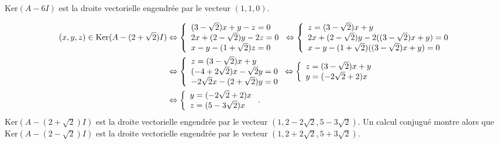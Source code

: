 {\begin{enumerate}
{$\text{Ker}(A-6I)$ est la droite vectorielle engendrée par le vecteur $(1,1,0)$.

\begin{align*}\ensuremath
(x,y,z)\in\text{Ker}(A-(2+\sqrt{2})I)&\Leftrightarrow\left\{
\begin{array}{l}
(3-\sqrt{2})x+y-z=0\\
2x+(2-\sqrt{2})y-2z=0\\
x-y-(1+\sqrt{2})z=0
\end{array}
\right.\Leftrightarrow\left\{
\begin{array}{l}
z=(3-\sqrt{2})x+y\\
2x+(2-\sqrt{2})y-2((3-\sqrt{2})x+y)=0\\
x-y-(1+\sqrt{2})((3-\sqrt{2})x+y)=0
\end{array}
\right.
\\
 &\Leftrightarrow\left\{
\begin{array}{l}
z=(3-\sqrt{2})x+y\\
(-4+2\sqrt{2})x-\sqrt{2}y=0\\
-2\sqrt{2}x-(2+\sqrt{2})y=0
\end{array}
\right.\Leftrightarrow\left\{
\begin{array}{l}
z=(3-\sqrt{2})x+y\\
y=(-2\sqrt{2}+2)x
\end{array}
\right.\\
 &\Leftrightarrow\left\{
\begin{array}{l}
y=(-2\sqrt{2}+2)x\\
z=(5-3\sqrt{2})x
\end{array}
\right..
\end{align*} $\text{Ker}(A-(2+\sqrt{2})I)$ est la droite vectorielle engendrée par le vecteur $(1,2-2\sqrt{2},5-3\sqrt{2})$. Un calcul conjugué montre alors que $\text{Ker}(A-(2-\sqrt{2})I)$ est la droite vectorielle engendrée par le vecteur $(1,2+2\sqrt{2},5+3\sqrt{2})$.

}
\end{enumerate}}
